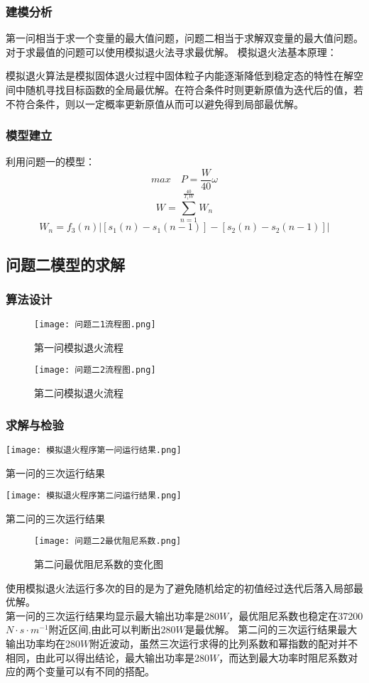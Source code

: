 \documentclass[a4paper,12pt]{article}
\begin{document}
	\subsubsection{建模分析}
	第一问相当于求一个变量的最大值问题，问题二相当于求解双变量的最大值问题。
	对于求最值的问题可以使用模拟退火法寻求最优解。
	模拟退火法基本原理：\par
	模拟退火算法是模拟固体退火过程中固体粒子内能逐渐降低到稳定态的特性在解空间中随机寻找目标函数的全局最优解。在符合条件时则更新原值为迭代后的值，若不符合条件，则以一定概率更新原值从而可以避免得到局部最优解。
	\subsubsection{模型建立}
	利用问题一的模型：
	$$max\quad P=\frac{W}{40}\omega$$
	$$W=\sum_{n=1}^{\frac{40}{T_1W}}W_n$$
	$$W_n=f_3(n)|[s_1(n)-s_1(n-1)]-[s_2(n)-s_2(n-1)]|$$
	\subsection{问题二模型的求解}
	\subsubsection{算法设计}
	\begin{figure}[H]
		\centering
		\texttt{[image: 问题二1流程图.png]}
		\caption{第一问模拟退火流程}
		\label{fig:表5}
	\end{figure}
	\begin{figure}[H]
		\centering
		\texttt{[image: 问题二2流程图.png]}
		\caption{第二问模拟退火流程}
		\label{fig:表6}
	\end{figure}
	\subsubsection{求解与检验}
	\begin{table}[H]
		\centering
		\texttt{[image: 模拟退火程序第一问运行结果.png]}
		\caption{第一问的三次运行结果}
		\label{fig:表3}
	\end{table}

	\begin{table}[H]
		\centering
		\texttt{[image: 模拟退火程序第二问运行结果.png]}
		\caption{第二问的三次运行结果}
		\label{fig:表4}
	\end{table}
	\begin{figure}[H]
		\centering
		\texttt{[image: 问题二2最优阻尼系数.png]}
		\caption{第二问最优阻尼系数的变化图}
		\label{fig:表10}
	\end{figure}
	使用模拟退火法运行多次的目的是为了避免随机给定的初值经过迭代后落入局部最优解。\\
	第一问的三次运行结果均显示最大输出功率是280$W$，最优阻尼系数也稳定在37200$N\cdot s\cdot m^{-1}$附近区间,由此可以判断出280$W$是最优解。
	第二问的三次运行结果最大输出功率均在280$W$附近波动，虽然三次运行求得的比列系数和幂指数的配对并不相同，由此可以得出结论，最大输出功率是280$W$，而达到最大功率时阻尼系数对应的两个变量可以有不同的搭配。
\end{document}

